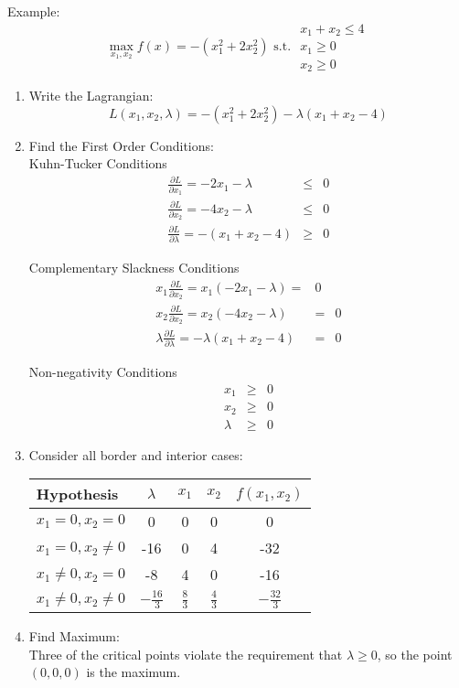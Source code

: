\documentclass[]{book}
\theoremstyle{definition}
\theoremstyle{definition}
\theoremstyle{definition}
\theoremstyle{remark}
\begin{document}
Example: \[\max_{x_1,x_2} f(x) = -(x_1^2 + 2x_2^2) \text{ s.t. } 
\begin{array}{l}
x_1 + x_2 \le 4\\
x_1 \ge 0\\
x_2 \ge 0
\end{array}\]

\begin{enumerate}
\item Write the Lagrangian:
$$L(x_1, x_2, \lambda) =  -(x_1^2 + 2x_2^2) - \lambda(x_1 + x_2 - 4)$$

\item Find the First Order Conditions:\\
Kuhn-Tucker Conditions
 \begin{eqnarray*}
\frac{\partial L}{\partial x_1} = -2x_1 - \lambda  & \leq & 0\\
\frac{\partial L}{\partial x_2}  = -4x_2 - \lambda & \leq  & 0\\
\frac{\partial L}{\partial \lambda} = -(x_1 + x_2 - 4)& \geq & 0
\end{eqnarray*}

Complementary Slackness Conditions
\begin{eqnarray*}
x_1\frac{\partial L}{\partial x_2} = x_1(-2x_1 - \lambda)  = & 0\\
x_2\frac{\partial L}{\partial x_2} = x_2(-4x_2 - \lambda)  & = & 0\\
\lambda\frac{\partial L}{\partial \lambda} = -\lambda(x_1 + x_2 - 4)& = & 0
\end{eqnarray*}

Non-negativity Conditions
\begin{eqnarray*}
x_1 & \geq & 0\\
x_2 & \geq & 0\\
\lambda & \geq & 0
\end{eqnarray*}

\item Consider all border and interior cases:
\begin{center}
\begin{tabular}{|l|ccc|c|}
\hline
Hypothesis  & $\lambda$& $x_1$ & $x_2$ & $f(x_1, x_2)$\\
\hline
$x_1 = 0, x_2 = 0$  &0 & 0 & 0 & 0\\
$x_1 = 0, x_2 \neq 0$  &-16 & 0 & 4 & -32\\
$x_1 \neq 0, x_2 = 0$  &-8 & 4 & 0 & -16\\
$x_1 \neq 0, x_2 \neq 0$ & $-\frac{16}{3}$ & $\frac{8}{3}$ & $\frac{4}{3}$ & $-\frac{32}{3}$\\
\hline
\end{tabular}
\end{center}

\item  Find Maximum:\\
Three of the critical points violate the requirement that $\lambda \geq 0$, so the point $(0,0,0)$ is the maximum.\\
\end{enumerate}
\end{document}

